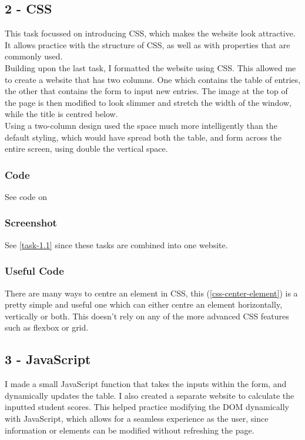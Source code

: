 \documentclass[12pt]{report}
\begin{document}
			\subsection{2 - CSS}
				This task focussed on introducing CSS, which makes the website look attractive. It allows practice with the structure of CSS, as well as with properties that are commonly used.\\

				Building upon the last task, I formatted the website using CSS. This allowed me to create a  website that has two columns. One which contains the table of entries, the other that contains the form to input new entries. The image at the top of the page is then modified to look slimmer and stretch the width of the window, while the title is centred below. \\

				Using a two-column design used the space much more intelligently than the default styling, which would have spread both the table, and form across the entire screen, using double the vertical space.\\

				\subsubsection{Code}
				See code on 


				\subsubsection{Screenshot}
					See \ref{task-1.1} since these tasks are combined into one website.\\

				\subsubsection{Useful Code}
					There are many ways to centre an element in CSS, this (\ref{css-center-element}) is a pretty simple and useful one which can either centre an element horizontally, vertically or both. This doesn't rely on any of the more advanced CSS features such as flexbox or grid.\\

			\subsection{3 - JavaScript}
				I made a small JavaScript function that takes the inputs within the form, and dynamically updates the table. I also created a separate website to calculate the inputted student scores. This helped practice modifying the DOM dynamically with JavaScript, which allows for a seamless experience as the user, since information or elements can be modified without refreshing the page.\\
\end{document}
